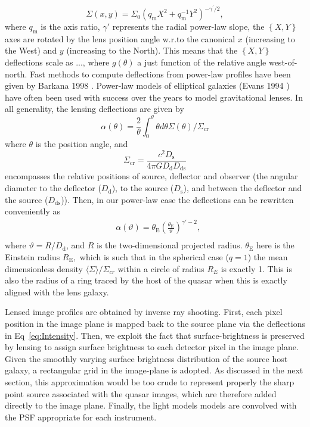 \documentclass[a4paper,11pt]{article}
\begin{document}
\begin{equation}
\Sigma(x,y)=\Sigma_{0}(q_\mathrm{m} X^{2}+q_\mathrm{m}^{-1}Y^{2})^{-\gamma^{\prime}/2},
\end{equation}
%
where $q_\mathrm{m}$ is the axis ratio, $\gamma'$ represents the radial power-law
slope, the $\left\{X,Y\right\}$ axes are rotated by the lens position
angle w.r.to the canonical $x$ (increasing to the West) and $y$
(increasing to the North). This means that the $\left\{X,Y\right\}$
deflections scale as ..., where $g(\theta)$ a just function of the
relative angle west-of-north. Fast methods to compute deflections from
power-law profiles have been given by Barkana 1998
\cite{1998ApJ...502..531B}. Power-law models of elliptical galaxies
(Evans 1994 \cite{1994MNRAS.267..333E}) have often been used with
success over the years to model gravitational lenses. In all
generality, the lensing deflections are given by
%
\begin{equation}
\alpha(\theta) = \frac{2}{\theta} \int_{0}^{\theta} \theta d\theta \Sigma (\theta) /\Sigma_{\mathrm{cr}}
\end{equation}
%
where $\theta$ is the position angle, and 
%
\begin{equation}
\Sigma_{\mathrm{cr}} = \frac{c^{2}D_{\mathrm{s}}}{4\pi G D_{\mathrm{d}} D_{\mathrm{ds}}}
\end{equation}
%
encompasses the relative positions of source, deflector and observer
(the angular diameter to the deflector ($D_{\mathrm{d}}$), to the
source ($D_{\mathrm{s}}$), and between the deflector and the source
($D_{\mathrm{ds}}$)). Then, in our power-law case the deflections can
be rewritten conveniently as
%
\begin{eqnarray}
   \label{eq:Intensity}
   &\alpha(\vartheta) = \theta_{\mathrm{E}}\left(\frac{\theta_{\mathrm{E}}}{\vartheta}\right)^{\gamma'-2} ,\\  
\end{eqnarray}
%
where $\vartheta = R/D_{\mathrm{d}}$, and $R$ is the two-dimensional
projected radius. $\theta_{\mathrm{E}}$ here is the Einstein radius
$R_{\mathrm{E}},$ which is such that in the spherical case ($q=1$) the
mean dimensionless density $\langle\Sigma\rangle/\Sigma_{cr}$ within a
circle of radius $R_E$ is exactly 1. This is also the radius of a ring
traced by the host of the quasar when this is exactly aligned with the
lens galaxy.

Lensed image profiles are obtained by inverse ray shooting. First,
each pixel position in the image plane is mapped back to the source
plane via the deflections in Eq~\ref{eq:Intensity}. Then, we exploit
the fact that surface-brightness is preserved by lensing to assign
surface brightness to each detector pixel in the image plane. Given
the smoothly varying surface brightness distribution of the source
host galaxy, a rectangular grid in the image-plane is adopted. As
discussed in the next section, this approximation would be too crude
to represent properly the sharp point source associated with the
quasar images, which are therefore added directly to the image plane.
Finally, the light models models are convolved with the PSF
appropriate for each instrument.
\end{document}
